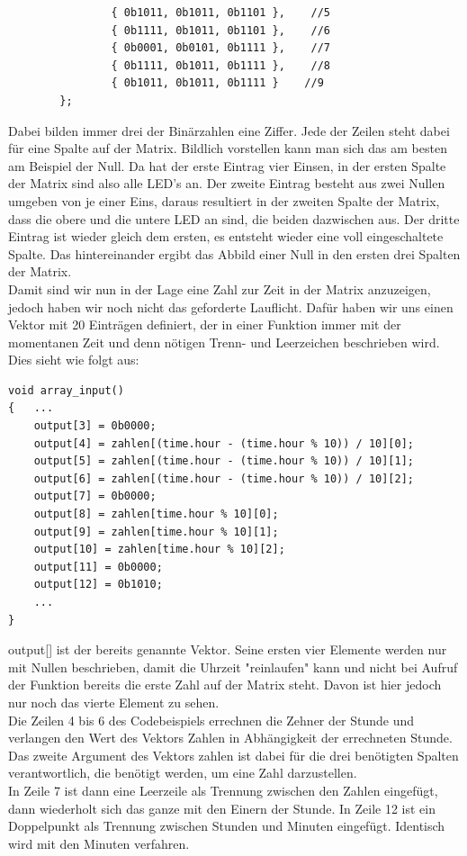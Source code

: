 \documentclass[openright,twoside,11pt,a4paper]{scrartcl}
\begin{document}
\begin{flushleft}
\begin{lstlisting}
			 	{ 0b1011, 0b1011, 0b1101 },    //5
			 	{ 0b1111, 0b1011, 0b1101 },    //6
			 	{ 0b0001, 0b0101, 0b1111 },    //7
			 	{ 0b1111, 0b1011, 0b1111 },    //8
			 	{ 0b1011, 0b1011, 0b1111 }    //9
	 	};
	 	\end{lstlisting}
	 	Dabei bilden immer drei der Binärzahlen eine Ziffer. Jede der Zeilen steht dabei für eine Spalte auf der Matrix. Bildlich vorstellen kann man sich das am besten am Beispiel der Null. Da hat der erste Eintrag vier Einsen, in der ersten Spalte der Matrix sind also alle LED's an. Der zweite Eintrag besteht aus zwei Nullen umgeben von je einer Eins, daraus resultiert in der zweiten Spalte der Matrix, dass die obere und die untere LED an sind, die beiden dazwischen aus. Der dritte Eintrag ist wieder gleich dem ersten, es entsteht wieder eine voll eingeschaltete Spalte. Das hintereinander ergibt das Abbild einer Null in den ersten drei Spalten der Matrix. \\
	 	Damit sind wir nun in der Lage eine Zahl zur Zeit in der Matrix anzuzeigen, jedoch haben wir noch nicht das geforderte Lauflicht. Dafür haben wir uns einen Vektor mit 20 Einträgen definiert, der in einer Funktion immer mit der momentanen Zeit und denn nötigen Trenn- und Leerzeichen beschrieben wird. Dies sieht wie folgt aus:
	 	\begin{lstlisting}
void array_input()
{	...
	output[3] = 0b0000;
	output[4] = zahlen[(time.hour - (time.hour % 10)) / 10][0];
	output[5] = zahlen[(time.hour - (time.hour % 10)) / 10][1];
	output[6] = zahlen[(time.hour - (time.hour % 10)) / 10][2];
	output[7] = 0b0000;
	output[8] = zahlen[time.hour % 10][0];
	output[9] = zahlen[time.hour % 10][1];
	output[10] = zahlen[time.hour % 10][2];
	output[11] = 0b0000;
	output[12] = 0b1010;
	...
}
	 	\end{lstlisting}
	 	output[] ist der bereits genannte Vektor. Seine ersten vier Elemente werden nur mit Nullen beschrieben, damit die Uhrzeit "reinlaufen" kann und nicht bei Aufruf der Funktion bereits die erste Zahl auf der Matrix steht. Davon ist hier jedoch nur noch das vierte Element zu sehen. \\
	 	Die Zeilen 4 bis 6 des Codebeispiels errechnen die Zehner der Stunde und verlangen den Wert des Vektors Zahlen in Abhängigkeit der errechneten Stunde. Das zweite Argument des Vektors zahlen ist dabei für die drei benötigten Spalten verantwortlich, die benötigt werden, um eine Zahl darzustellen.\\
	 	In Zeile 7 ist dann eine Leerzeile als Trennung zwischen den Zahlen eingefügt, dann wiederholt sich das ganze mit den Einern der Stunde. In Zeile 12 ist ein Doppelpunkt als Trennung zwischen Stunden und Minuten eingefügt. Identisch wird mit den Minuten verfahren.\\

\end{flushleft}
\end{document}
